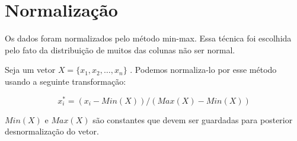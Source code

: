 \section{Normalização}

Os dados foram normalizados pelo método min-max. Essa técnica foi escolhida pelo
fato da distribuição de muitos das colunas não ser normal.

Seja um vetor $X = \{x_1,x_2,\dots,x_n\}$ . Podemos normaliza-lo por esse método usando a
seguinte transformação:


\[
x^*_{i} = ( x_i - Min(X))/(Max(X) - Min(X)) 
\]

$Min(X)$  e $Max(X)$ são constantes que devem ser guardadas para posterior
desnormalização do vetor.





